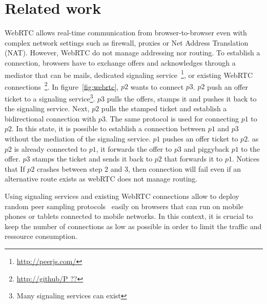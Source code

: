 
\begin{figure*}
\centering
{}
\hspace{20pt}
\hspace{20pt}
\caption{\label{fig:webrtc}Creating an overlay network on top of WebRTC.}
\end{figure*}


\section{Related work}
\label{sec:relatedwork}


WebRTC allows real-time communication from browser-to-browser even
with complex network settings such as firewall, proxies or Net Address
Translation (NAT). However, WebRTC do not manage addressing nor
routing. To establish a connection, browsers have to exchange offers
and acknowledges through a mediator that can be mails, dedicated
signaling service~\footnote{\url{http://peerjs.com/}}, or existing
WebRTC connections~\footnote{\url{http://github/P ??}}. In
figure~\ref{fig:webrtc}, $p2$ wants to connect $p3$. $p2$ push an
offer ticket to a signaling service\footnote{Many signaling services
  can exist}. $p3$ pulls the offers, stamps it and pushes it back to
the signaling service. Next, $p2$ pulls the stamped ticket and
establish a bidirectional connection with $p3$. The same protocol is
used for connecting $p1$ to $p2$. In this state, it is possible to
establish a connection between $p1$ and $p3$ without the mediation of
the signaling service. $p1$ pushes an offer ticket to $p2$.  as $p2$
is already connected to $p1$, it forwards the offer to $p3$ and
piggyback $p1$ to the offer. $p3$ stamps the ticket and sends it back
to $p2$ that forwards it to $p1$. Notices that If $p2$ crashes between
step 2 and 3, then connection will fail even if an alternative route
exists as webRTC does not manage routing.  

Using signaling services and existing WebRTC connections allow to
deploy random peer sampling protocols~\cite{jelasity2004peer} easily
on browsers that can run on mobile phones or tablets connected to
mobile networks. In this context, it is crucial to keep the number of
connections as low as possible in order to limit the traffic and
ressource consumption. 


